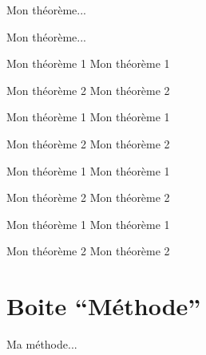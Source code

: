 \documentclass[a4paper,12pt]{article}
\begin{document}
\begin{code}%
\begin{theoreme*}
	Mon théorème...
\end{theoreme*}
\end{code}

\begin{theoreme*}
	Mon théorème...
\end{theoreme*}%

\begin{code}%
\begin{theoremes}
	\item[Mon théorème 1] Mon théorème 1
	\item[Mon théorème 2] Mon théorème 2
\end{theoremes}
\end{code}

\begin{theoremes}
	\item[Mon théorème 1] Mon théorème 1
	\item[Mon théorème 2] Mon théorème 2
\end{theoremes}%

\begin{code}%
\begin{theoremes*}
	\item[Mon théorème 1] Mon théorème 1
	\item[Mon théorème 2] Mon théorème 2
\end{theoremes*}
\end{code}

\begin{theoremes*}
	\item[Mon théorème 1] Mon théorème 1
	\item[Mon théorème 2] Mon théorème 2
\end{theoremes*}%



	\section{Boite ``Méthode''}

\begin{code}%
\begin{methode}
	Ma méthode...
\end{methode}
\end{code}
\end{document}
